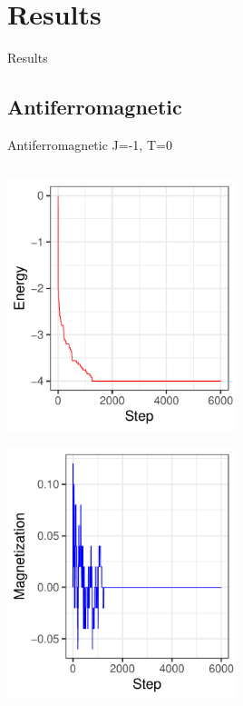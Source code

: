 \documentclass{beamer}
\begin{document}
\section{Results}

\begin{frame}
\begin{center}
{\Huge Results}
\end{center}
\end{frame}




\subsection{Antiferromagnetic}


\begin{frame}{Antiferromagnetic J=-1, T=0}
\begin{columns}
\begin{column}{0.5\textwidth}
    \begin{center}
     \includegraphics[width=0.5\textwidth]{Pic/J-1_10_6000_T=0_ENERGY.pdf}
     \end{center}
         \begin{center}
     \includegraphics[width=0.5\textwidth]{Pic/J-1_10_6000_T=0_Magnetization.pdf}

\end{center}
\end{column}
\end{columns}
\end{frame}
\end{document}
